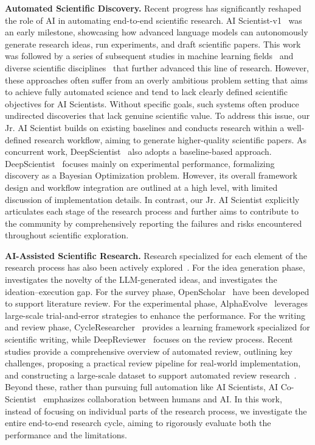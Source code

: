 \textbf{Automated Scientific Discovery.} 
Recent progress has significantly reshaped the role of AI in automating end-to-end scientific research.
AI Scientist-v1~\citep{lu2024ai} was an early milestone, showcasing how advanced language models can autonomously generate research ideas, run experiments, and draft scientific papers.
This work was followed by a series of subsequent studies in machine learning fields~\citep{zochi2025,tang2025ai} and diverse scientific disciplines~\citep{villaescusa2025denario, mitchener2025kosmos} that further advanced this line of research.
However, these approaches often suffer from an overly ambitious problem setting that aims to achieve fully automated science and tend to lack clearly defined scientific objectives for AI Scientists. Without specific goals, such systems often produce undirected discoveries that lack genuine scientific value. 
To address this issue, our Jr. AI Scientist builds on existing baselines and conducts research within a well-defined research workflow, aiming to generate higher-quality scientific papers.
As concurrent work, DeepScientist~\citep{weng2025deepscientist} also adopts a baseline-based approach. 
DeepScientist~\citep{weng2025deepscientist} focuses mainly on experimental performance, formalizing discovery as a Bayesian Optimization problem. However, its overall framework design and workflow integration are outlined at a high level, with limited discussion of implementation details. In contrast, our Jr. AI Scientist explicitly articulates each stage of the research process and further aims to contribute to the community by comprehensively reporting the failures and risks encountered throughout scientific exploration.

\textbf{AI-Assisted Scientific Research.} 
Research specialized for each element of the research process has also been actively explored~\citep{chen2025ai4research}.
For the idea generation phase, \cite{si2024can} investigates the novelty of the LLM-generated ideas, and \cite{si2025ideation} investigates the ideation–execution gap.
For the survey phase, OpenScholar~\citep{asai2024openscholar} have been developed to support literature review.
For the experimental phase, AlphaEvolve~\citep{novikov2025alphaevolve} leverages large-scale trial-and-error strategies to enhance the performance.
For the writing and review phase, CycleResearcher~\citep{weng2024cycleresearcher} provides a learning framework specialized for scientific writing, while DeepReviewer~\citep{zhu2025deepreview} focuses on the review process. Recent studies provide a comprehensive overview of automated review, outlining key challenges, proposing a practical review pipeline for real-world implementation, and constructing a large-scale dataset to support automated review research~\citep{ZHUANG2025103332, Lin2023ASPR, lin2023moprd}.
Beyond these, rather than pursuing full automation like AI Scientists, AI Co-Scientist~\citep{gottweis2025towards} emphasizes collaboration between humans and AI.
In this work, instead of focusing on individual parts of the research process, we investigate the entire end-to-end research cycle, aiming to rigorously evaluate both the performance and the limitations.


